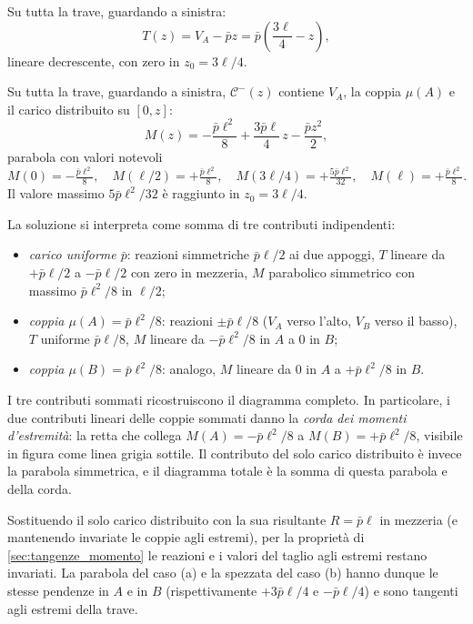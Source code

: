 \begin{esempio}
\begin{svolgimento}
		Su tutta la trave, guardando a sinistra:
		\[
		T(z) = V_A - \bar p z
		= \bar p\!\left(\frac{3\ell}{4} - z\right),
		\]
		lineare decrescente, con zero in $z_0 = 3\ell/4$.
		
		Su tutta la trave, guardando a sinistra,
		$\mathcal{C}^-(z)$ contiene $V_A$, la coppia
		$\mu(A)$ e il carico distribuito su $[0,z]$:
		\[
		M(z) = -\frac{\bar p\ell^2}{8}
		+ \frac{3\bar p\ell}{4}\,z
		- \frac{\bar p z^2}{2},
		\]
		parabola con valori notevoli
		\[
		M(0) = -\tfrac{\bar p\ell^2}{8}, \quad
		M(\ell/2) = +\tfrac{\bar p\ell^2}{8}, \quad
		M(3\ell/4) = +\tfrac{5\bar p\ell^2}{32}, \quad
		M(\ell) = +\tfrac{\bar p\ell^2}{8}.
		\]
		Il valore massimo $5\bar p\ell^2/32$ è raggiunto
		in $z_0 = 3\ell/4$.
		
		La soluzione si interpreta come somma di tre
		contributi indipendenti:
		\begin{itemize}[nosep]
			\item \emph{carico uniforme $\bar p$}: reazioni
			simmetriche $\bar p\ell/2$ ai due appoggi, $T$
			lineare da $+\bar p\ell/2$ a $-\bar p\ell/2$
			con zero in mezzeria, $M$ parabolico simmetrico
			con massimo $\bar p\ell^2/8$ in $\ell/2$;
			\item \emph{coppia $\mu(A) = \bar p\ell^2/8$}:
			reazioni $\pm\bar p\ell/8$ ($V_A$ verso l'alto,
			$V_B$ verso il basso), $T$ uniforme $\bar p\ell/8$,
			$M$ lineare da $-\bar p\ell^2/8$ in $A$ a $0$ in $B$;
			\item \emph{coppia $\mu(B) = \bar p\ell^2/8$}:
			analogo, $M$ lineare da $0$ in $A$ a
			$+\bar p\ell^2/8$ in $B$.
		\end{itemize}
		I tre contributi sommati ricostruiscono il diagramma
		completo. In particolare, i due contributi lineari
		delle coppie sommati danno la \emph{corda dei
			momenti d'estremità}: la retta che collega
		$M(A) = -\bar p\ell^2/8$ a $M(B) = +\bar p\ell^2/8$,
		visibile in figura come linea grigia sottile. Il
		contributo del solo carico distribuito è invece
		la parabola simmetrica, e il diagramma totale è
		la somma di questa parabola e della corda.
		
		Sostituendo il solo carico distribuito con la sua
		risultante $R = \bar p\ell$ in mezzeria (e
		mantenendo invariate le coppie agli estremi), per
		la proprietà di
		\ref{sec:tangenze_momento} le reazioni e i valori
		del taglio agli estremi restano invariati. La
		parabola del caso (a) e la spezzata del caso (b)
		hanno dunque le stesse pendenze in $A$ e in $B$
		(rispettivamente $+3\bar p\ell/4$ e $-\bar p\ell/4$)
		e sono tangenti agli estremi della trave.
		

\end{svolgimento}
\end{esempio}
